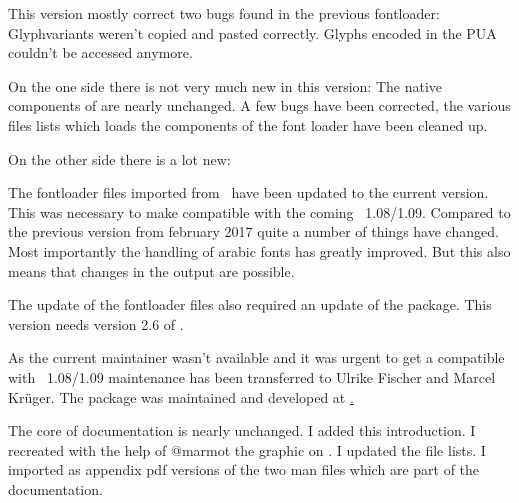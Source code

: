 This version mostly correct two bugs found in the previous fontloader: Glyphvariants weren't copied and pasted correctly. Glyphs encoded in the PUA couldn't be accessed anymore.

\endsubsection



On the one side there is not very much new in this version: The native components of  are nearly unchanged. A few bugs have been corrected, the various files lists which loads the components of the font loader have been cleaned up.

On the other side there is a lot new:

\begindescriptions

   The fontloader files imported from \ConTeXt\ have been updated to the current version.
   This was necessary to make  compatible with the coming \LuaTeX\ 1.08/1.09. Compared to the previous version from february 2017 quite a number of things have changed. Most importantly the handling of arabic fonts has greatly improved. But this also means that changes in the output are possible.
  \endaltitem

   The update of the fontloader files also required an update of the  package. This  version needs version 2.6 of .
  \endaltitem

   As the current maintainer wasn't available and it was urgent to get a  compatible with \LuaTeX\ 1.08/1.09 maintenance has been transferred to Ulrike Fischer and Marcel Krüger. The package was maintained and developed at \hyperlink{https://github.com/u-fischer/luaotfload}.
  \endaltitem

  The core of documentation is nearly unchanged. I added this introduction. I recreated with the help of @marmot the graphic on \pageref{file-graph}. I updated the file lists. I imported as appendix pdf versions of the two man files which are part of the  documentation.
  \endaltitem

\enddescriptions

\endsubsection
\endsection

